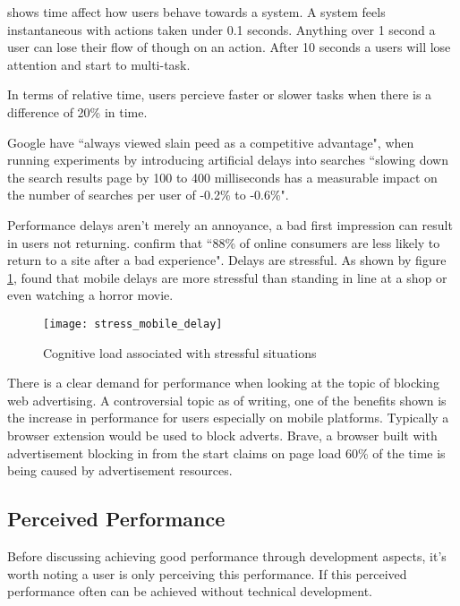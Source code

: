 \cite{usability_engineering} shows time affect how users behave towards a system. A system feels instantaneous with actions taken under 0.1 seconds. Anything over 1 second a user can lose their flow of though on an action. After 10 seconds a users will lose attention and start to multi-task.

In terms of relative time, users percieve faster or slower tasks when there is a difference of 20\% in time. \cite{setting_a_performance_budget}

Google have ``always viewed slain peed as a competitive advantage", when running experiments by introducing artificial delays into searches ``slowing down the search results page by 100 to 400 milliseconds has a measurable impact on the number of searches per user of -0.2\% to -0.6\%". \cite{speed_matters}

Performance delays aren't merely an annoyance, a bad first impression can result in users not returning. \cite{why_web_performance_matters} confirm that ``88\% of online consumers are less likely to return to a site after a bad experience". Delays are stressful. As shown by figure \ref{figure-stress-mobile-delay}, \cite{ericsson} found that mobile delays are more stressful than standing in line at a shop or even watching a horror movie.

\begin{figure}[H]
  \centering
    \texttt{[image: stress\_mobile\_delay]}
  \caption{Cognitive load associated with stressful situations \protect\cite{ericsson}}
  \label{figure-stress-mobile-delay}
\end{figure}

There is a clear demand for performance when looking at the topic of blocking web advertising. A controversial topic as of writing, one of the benefits shown is the increase in performance for users especially on mobile platforms. Typically a browser extension would be used to block adverts. Brave, a browser built with advertisement blocking in from the start claims on page load 60\% of the time is being caused by advertisement resources. \cite{brave}

\subsection{Perceived Performance} \label{l-r--perceived-performance}

Before discussing achieving good performance through development aspects, it's worth noting a user is only perceiving this performance. If this perceived performance often can be achieved without technical development.

